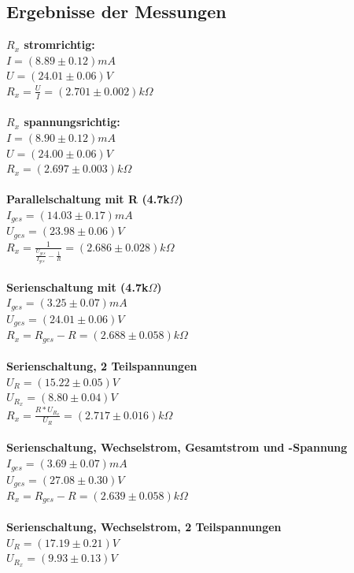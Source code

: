 \documentclass[12pt,a4paper]{article}
\begin{document}
\begin{multicols}{2}
\subsection{Ergebnisse der Messungen}
\textbf{$R_{x}$ stromrichtig:}\\
$I = (8.89 \pm 0.12) mA$\\
$U = (24.01 \pm 0.06) V$ \\
$R_{x} = \frac{U}{I} = (2.701 \pm 0.002) k\Omega$\\
\\
\textbf{$R_{x}$ spannungsrichtig:}\\
$I = (8.90 \pm 0.12) mA$\\
$U = (24.00 \pm 0.06) V$ \\
$R_{x} = (2.697 \pm 0.003) k\Omega$\\
\\
\textbf{Parallelschaltung mit R (4.7k$\Omega$)}\\
$I_{ges} = (14.03 \pm 0.17) mA$\\
$U_{ges} = (23.98 \pm 0.06) V$\\
$R_{x} = \frac{1}{ \frac{U_{ges} }{ I_{ges}} - \frac{1}{R}} = (2.686 \pm 0.028) k\Omega$ \\
\\
\textbf{Serienschaltung mit (4.7k$\Omega$)}\\
$I_{ges} = (3.25 \pm 0.07) mA$\\
$U_{ges} = (24.01 \pm 0.06) V$\\
$R_{x} = R_{ges} - R = (2.688 \pm 0.058) k\Omega$\\
\\
\textbf{Serienschaltung, 2 Teilspannungen}\\
$U_{R} = (15.22 \pm 0.05) V$\\
$U_{R_{x}} = (8.80 \pm 0.04) V$\\
$R_{x} = \frac{R*U_{R_{x}}}{U_{R}} = (2.717 \pm 0.016) k\Omega$\\
\\
\textbf{Serienschaltung, Wechselstrom, Gesamtstrom und -Spannung}\\
$I_{ges} = (3.69 \pm 0.07) mA$\\
$U_{ges} = (27.08 \pm 0.30) V$\\
$R_{x} = R_{ges} - R = (2.639 \pm 0.058) k\Omega$\\
\\
\textbf{Serienschaltung, Wechselstrom, 2 Teilspannungen}\\
$U_{R} = (17.19 \pm 0.21) V$\\
$U_{R_{x}} = (9.93 \pm 0.13) V$\\

\end{multicols}
\end{document}
